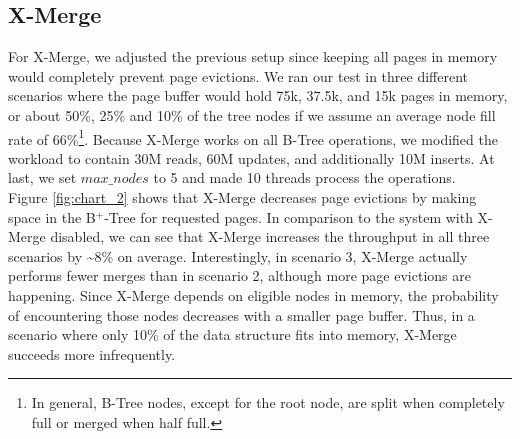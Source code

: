 \documentclass[acmlarge,nonacm,dvipsnames]{acmart}
\begin{document}
\subsection{X-Merge}
For X-Merge, we adjusted the previous setup since keeping all pages in memory would completely prevent page evictions. We ran our test in three different scenarios where the page buffer would hold 75k, 37.5k, and 15k pages in memory, or about 50\%, 25\% and 10\% of the tree nodes if we assume an average node fill rate of 66\%\footnote{In general, B-Tree nodes, except for the root node, are split when completely full or merged when half full.}. Because X-Merge works on all B-Tree operations, we modified the workload to contain 30M reads, 60M updates, and additionally 10M inserts. At last, we set $max\_nodes$ to 5 and made 10 threads process the operations.\\
Figure \ref{fig:chart_2} shows that X-Merge decreases page evictions by making space in the B$^+$-Tree for requested pages. In comparison to the system with X-Merge disabled, we can see that X-Merge increases the throughput in all three scenarios by \textasciitilde8\% on average. Interestingly, in scenario 3, X-Merge actually performs fewer merges than in scenario 2, although more page evictions are happening. Since X-Merge depends on eligible nodes in memory, the probability of encountering those nodes decreases with a smaller page buffer. Thus, in a scenario where only 10\% of the data structure fits into memory, X-Merge succeeds more infrequently.
\end{document}
